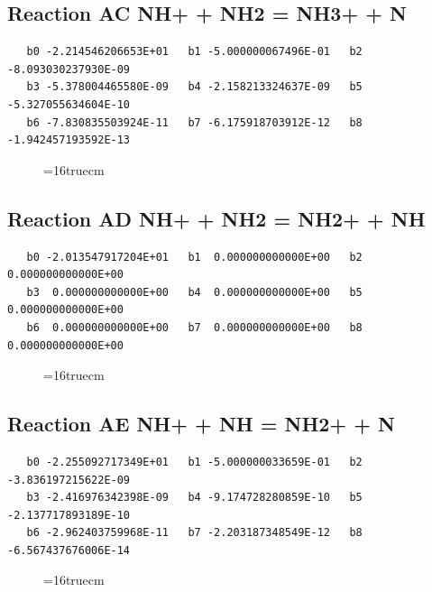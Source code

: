 \documentclass[12pt,dvipdfm]{article}
\begin{document}
\subsection{
Reaction AC NH+ + NH2 = NH3+ + N }
\begin{small}\begin{verbatim}
   b0 -2.214546206653E+01   b1 -5.000000067496E-01   b2 -8.093030237930E-09
   b3 -5.378004465580E-09   b4 -2.158213324637E-09   b5 -5.327055634604E-10
   b6 -7.830835503924E-11   b7 -6.175918703912E-12   b8 -1.942457193592E-13
\end{verbatim}\end{small}
\begin{figure}[h!] \label{n2rates}
\epsfxsize=16truecm
\end{figure}
\newpage

\subsection{
Reaction AD NH+ + NH2 = NH2+ + NH }
\begin{small}\begin{verbatim}
   b0 -2.013547917204E+01   b1  0.000000000000E+00   b2  0.000000000000E+00
   b3  0.000000000000E+00   b4  0.000000000000E+00   b5  0.000000000000E+00
   b6  0.000000000000E+00   b7  0.000000000000E+00   b8  0.000000000000E+00
\end{verbatim}\end{small}
\begin{figure}[h!] \label{n2rates}
\epsfxsize=16truecm
\end{figure}
\newpage

\subsection{
Reaction AE NH+ + NH = NH2+ + N }
\begin{small}\begin{verbatim}
   b0 -2.255092717349E+01   b1 -5.000000033659E-01   b2 -3.836197215622E-09
   b3 -2.416976342398E-09   b4 -9.174728280859E-10   b5 -2.137717893189E-10
   b6 -2.962403759968E-11   b7 -2.203187348549E-12   b8 -6.567437676006E-14
\end{verbatim}\end{small}
\begin{figure}[h!] \label{n2rates}
\epsfxsize=16truecm
\end{figure}
\newpage
\end{document}
